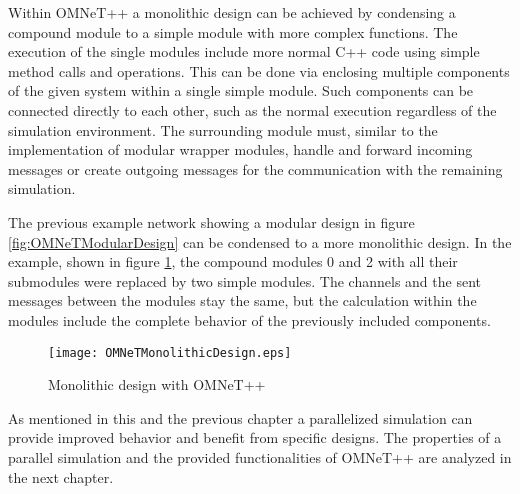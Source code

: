 Within OMNeT++ a monolithic design can be achieved by condensing a compound module to a simple module with more complex functions.
The execution of the single modules include more normal C++ code using simple method calls and operations.
This can be done via enclosing multiple components of the given system within a single simple module.
Such components can be connected directly to each other, such as the normal execution regardless of the simulation environment.
The surrounding module must, similar to the implementation of modular wrapper modules, handle and forward incoming messages or create outgoing messages for the communication with the remaining simulation.

The previous example network showing a modular design in figure \ref{fig:OMNeTModularDesign} can be condensed to a more monolithic design.
In the example, shown in figure \ref{fig:OMNeTMonolithicDesign}, the compound modules 0 and 2 with all their submodules were replaced by two simple modules.
The channels and the sent messages between the modules stay the same, but the calculation within the modules include the complete behavior of the previously included components.

\begin{figure}
    \centering
    \texttt{[image: OMNeTMonolithicDesign.eps]}
    \caption{Monolithic design with OMNeT++}
    \label{fig:OMNeTMonolithicDesign}
\end{figure}

As mentioned in this and the previous chapter a parallelized simulation can provide improved behavior and benefit from specific designs.
The properties of a parallel simulation and the provided functionalities of OMNeT++ are analyzed in the next chapter.